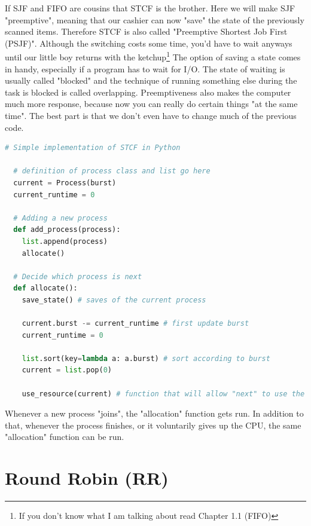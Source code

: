 \documentclass{report}
\newcounter{defi}[section]\setcounter{defi}{0}
\begin{document}
If SJF and FIFO are cousins that STCF is the brother.
Here we will make SJF "preemptive", meaning that our cashier can now "save" the state of the previously scanned items. 
Therefore STCF is also called "Preemptive Shortest Job First (PSJF)".
Although the switching costs some time, you'd have to wait anyways until our little boy returns with the ketchup\footnote{If you don't know what I am talking about read Chapter 1.1 (FIFO)}
The option of saving a state comes in handy, especially if a program has to wait for I/O.
The state of waiting is usually called "blocked" and the technique of running something else during the task is blocked is called overlapping.
Preemptiveness also makes the computer much more response, because now you can really do certain things "at the same time".
The best part is that we don't even have to change much of the previous code.
\pagebreak
\begin{lstlisting}[language=Python, style=colorEX, label=cd:stcf-python]
  # Simple implementation of STCF in Python
  
  # definition of process class and list go here
  current = Process(burst)
  current_runtime = 0
  
  # Adding a new process
  def add_process(process): 
    list.append(process)
    allocate()
  
  # Decide which process is next
  def allocate():
    save_state() # saves of the current process

    current.burst -= current_runtime # first update burst
    current_runtime = 0

    list.sort(key=lambda a: a.burst) # sort according to burst
    current = list.pop(0)

    use_resource(current) # function that will allow "next" to use the CPU (also tracks runtime)
\end{lstlisting}
Whenever a new process "joins", the "allocation" function gets run.
In addition to that, whenever the process finishes, or it voluntarily gives up the CPU, the same "allocation" function can be run.


\section{Round Robin (RR)}
\end{document}

